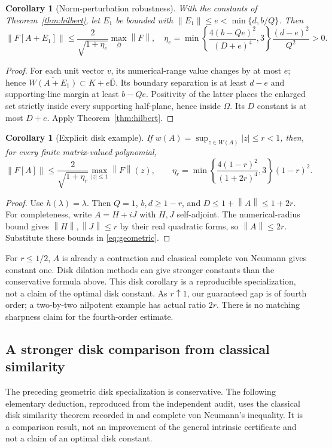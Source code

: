\documentclass[11pt]{article}
\newtheorem{corollary}[theorem]{Corollary}
\theoremstyle{remark}\newtheorem{remark}[theorem]{Remark}
\newcommand{\norm}[1]{\left\lVert #1\right\rVert}
\begin{document}
\begin{corollary}[Norm-perturbation robustness]\label{cor:perturb}
With the constants of Theorem~\ref{thm:hilbert}, let $E_1$ be bounded with $\norm{E_1}\le e<\min\{d,b/Q\}$. Then
\[\norm{F[A+E_1]}\le\frac2{\sqrt{1+\eta_e}}\max_{\bar\Omega}\norm F,
\quad
\eta_e=\min\left\{\frac{4(b-Qe)^2}{(D+e)^4},3\right\}\frac{(d-e)^2}{Q^2}>0.
\]
\end{corollary}
\begin{proof}
For each unit vector $v$, its numerical-range value changes by at most $e$; hence
$\overline{W(A+E_1)}\subset K+e\bar{\mathbb D}$.
Its boundary separation is at least $d-e$ and supporting-line margin at least $b-Qe$. Positivity of the latter places the enlarged set strictly inside every supporting half-plane, hence inside $\Omega$. Its $D$ constant is at most $D+e$. Apply Theorem~\ref{thm:hilbert}.
\end{proof}

\begin{corollary}[Explicit disk example]\label{cor:disk}
If $w(A)=\sup_{z\in W(A)}|z|\le r<1$, then, for every finite matrix-valued polynomial,
\[\norm{F[A]}\le
\frac2{\sqrt{1+\eta_r}}\max_{|z|\le1}\norm F(z),\qquad
\eta_r=\min\left\{\frac{4(1-r)^2}{(1+2r)^4},3\right\}(1-r)^2.
\]
\end{corollary}
\begin{proof}
Use $h(\lambda)=\lambda$. Then $Q=1$, $b,d\ge1-r$, and $D\le1+\norm A\le1+2r$. For completeness, write $A=H+iJ$ with $H,J$ self-adjoint. The numerical-radius bound gives $\norm H,\norm J\le r$ by their real quadratic forms, so $\norm A\le2r$. Substitute these bounds in \eqref{eq:geometric}.
\end{proof}
For $r\le1/2$, $A$ is already a contraction and classical complete von Neumann gives constant one. Disk dilation methods can give stronger constants than the conservative formula above. This disk corollary is a reproducible specialization, not a claim of the optimal disk constant. As $r\uparrow1$, our guaranteed gap is of fourth order; a two-by-two nilpotent example has actual ratio $2r$. There is no matching sharpness claim for the fourth-order estimate.


\subsection{A stronger disk comparison from classical similarity}\label{sec:disk-comparison}
The preceding geometric disk specialization is conservative. The following elementary deduction, reproduced from the independent audit, uses the classical disk similarity theorem recorded in \cite[Theorem 5.1]{BCD} and complete von Neumann's inequality. It is a comparison result, not an improvement of the general intrinsic certificate and not a claim of an optimal disk constant.
\end{document}

